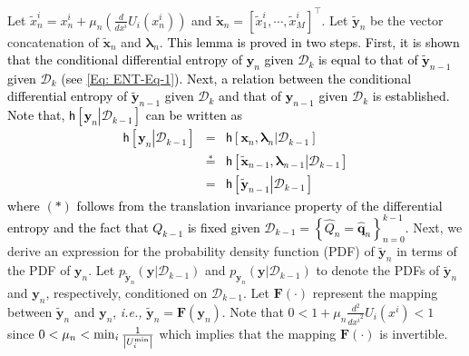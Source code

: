 \documentclass[10pt,twocolumn,twoside]{IEEEtran}
\begin{document}
\begin{IEEEproof}
Let $\tilde{x}^i_n={x}^{i}_{n}+\mu_{n} {\left({\frac{d}{d {x}^{i}}U_i{\left({{x}^{i}_{n}}\right)}}\right)}$ and ${\ensuremath{\boldsymbol{{\tilde{x}}}}}_n=\left[\tilde{x}^i_1,\cdots,\tilde{x}^i_M\right]^\top$. Let ${\ensuremath{\boldsymbol{{\tilde{y}}}}}_n$ be the vector concatenation of ${\ensuremath{\boldsymbol{{\tilde{x}}}}}_n$ and ${\ensuremath{\boldsymbol{{\lambda}}}}_n$. \textcolor{black}{This lemma is proved in two steps. First, it is shown that the conditional differential entropy of ${\ensuremath{\boldsymbol{{y}}}}_n$ given $\mathcal{D}_k$ is equal to that of ${\ensuremath{\boldsymbol{{\tilde{y}}}}}_{n-1}$ given $\mathcal{D}_k$ (see \eqref{Eq: ENT-Eq-1}). Next, a relation between the conditional differential entropy of ${\ensuremath{\boldsymbol{{\tilde{y}}}}}_{n-1}$ given $\mathcal{D}_k$ and that of ${\ensuremath{\boldsymbol{{y}}}}_{n-1}$ given $\mathcal{D}_k$ is established. Note that, ${\ensuremath{\mathsf{h}\left[\left.{{\ensuremath{\boldsymbol{{y}}}}_n}\right|{\mathcal{D}_{k-1}}\right]}}$ can be written as
\begin{eqnarray}\label{Eq: ENT-Eq-1}
{\ensuremath{\mathsf{h}\left[\left.{{\ensuremath{\boldsymbol{{y}}}}_n}\right|{\mathcal{D}_{k-1}}\right]}}&=&{\ensuremath{\mathsf{h}\left[\left.{{\ensuremath{\boldsymbol{{x}}}}_n,{\ensuremath{\boldsymbol{{\lambda}}}}_n}\right|{\mathcal{D}_{k-1}}\right]}}\nonumber\\
&\stackrel{*}{=}&{\ensuremath{\mathsf{h}\left[\left.{{\ensuremath{\boldsymbol{{\tilde{x}}}}}_{n-1},{\ensuremath{\boldsymbol{{\lambda}}}}_{n-1}}\right|{\mathcal{D}_{k-1}}\right]}}\nonumber\\
&=&{\ensuremath{\mathsf{h}\left[\left.{{\ensuremath{\boldsymbol{{\tilde{y}}}}}_{n-1}}\right|{\mathcal{D}_{k-1}}\right]}}
\end{eqnarray}
where ${\left({*}\right)}$ follows from the translation invariance property of the differential entropy and the fact that  $Q_{k-1}$ is fixed given $\mathcal{D}_{k-1}=\left\{\hat{Q}_n={\ensuremath{\boldsymbol{{\hat{q}}}}}_n\right\}_{n=0}^{k-1}$.} Next, we derive an expression for the probability density function (PDF) of ${\ensuremath{\boldsymbol{{\tilde{y}}}}}_n$ in terms of the PDF of ${\ensuremath{\boldsymbol{{y}}}}_{n}$. Let $p_{{\ensuremath{\boldsymbol{{\tilde{y}}}}}_{n}}{\left({{\ensuremath{\boldsymbol{{y}}}}\left|\mathcal{D}_{k-1}\right.}\right)}$ and $p_{{\ensuremath{\boldsymbol{{y}}}}_{n}}{\left({{\ensuremath{\boldsymbol{{y}}}}\left|\mathcal{D}_{k-1}\right.}\right)}$ to denote the PDFs of ${\ensuremath{\boldsymbol{{\tilde{y}}}}}_n$ and ${\ensuremath{\boldsymbol{{y}}}}_{n}$, respectively, conditioned on $\mathcal{D}_{k-1}$.  Let ${\ensuremath{\boldsymbol{{F}}}}{\left({\cdot}\right)}$ represent the mapping between ${\ensuremath{\boldsymbol{{\tilde{y}}}}}_n$ and ${\ensuremath{\boldsymbol{{y}}}}_n$, \emph{i.e.,} ${\ensuremath{\boldsymbol{{\tilde{y}}}}}_n={\ensuremath{\boldsymbol{{F}}}}{\left({{\ensuremath{\boldsymbol{{y}}}}_n}\right)}$.  Note that $0<1+\mu_{n}\frac{d^2}{d {x^i}^2}U_i{\left({x^i}\right)}<1$ since  $0<\mu_{n}< \min_i\frac{1}{{\left|{U^{\rm min}_i}\right|}}$ which implies that the mapping ${\ensuremath{\boldsymbol{{F}}}}{\left({\cdot}\right)}$ is invertible. 

\end{IEEEproof}
\end{document}
